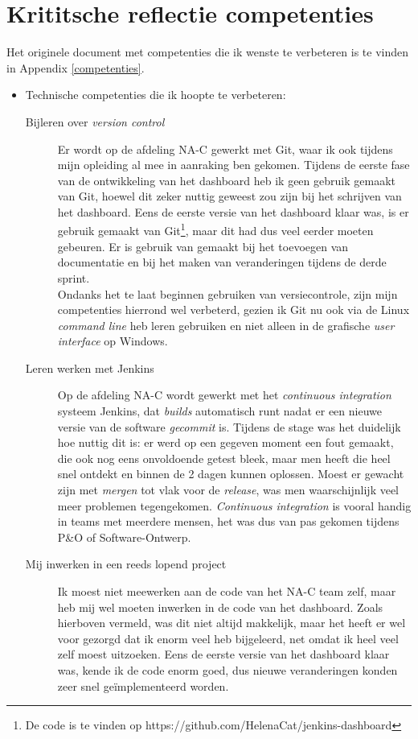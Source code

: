 \documentclass[10pt,a4paper]{article}
\begin{document}
\section{Krititsche reflectie competenties}
\label{reflectie}
Het originele document met competenties die ik wenste te verbeteren is te vinden in Appendix \ref{competenties}.
\begin{itemize}
\item Technische competenties die ik hoopte te verbeteren:
\begin{description}
\item[Bijleren over \textit{version control}] Er wordt op de afdeling NA-C gewerkt met Git, waar ik ook tijdens mijn opleiding al mee in aanraking ben gekomen. Tijdens de eerste fase van de ontwikkeling van het dashboard heb ik geen gebruik gemaakt van Git, hoewel dit zeker nuttig geweest zou zijn bij het schrijven van het dashboard. Eens de eerste versie van het dashboard klaar was, is er gebruik gemaakt van Git\footnote{De code is te vinden op https://github.com/HelenaCat/jenkins-dashboard}, maar dit had dus veel eerder moeten gebeuren. Er is gebruik van gemaakt bij het toevoegen van documentatie en bij het maken van veranderingen tijdens de derde sprint.\\
Ondanks het te laat beginnen gebruiken van versiecontrole, zijn mijn competenties hierrond wel verbeterd, gezien ik Git nu ook via de Linux \textit{command line} heb leren gebruiken en niet alleen in de grafische \textit{user interface} op Windows. 
\item[Leren werken met Jenkins] Op de afdeling NA-C wordt gewerkt met het \textit{continuous integration} systeem Jenkins, dat \textit{builds} automatisch runt nadat er een nieuwe versie van de software \textit{gecommit} is. Tijdens de stage was het duidelijk hoe nuttig dit is: er werd op een gegeven moment een fout gemaakt, die ook nog eens onvoldoende getest bleek, maar men heeft die heel snel ontdekt en binnen de 2 dagen kunnen oplossen. Moest er gewacht zijn met \textit{mergen} tot vlak voor de \textit{release}, was men waarschijnlijk veel meer problemen tegengekomen. \textit{Continuous integration} is vooral handig in teams met meerdere mensen, het was dus van pas gekomen tijdens P\&O of Software-Ontwerp. 
\item[Mij inwerken in een reeds lopend project] Ik moest niet meewerken aan de code van het NA-C team zelf, maar heb mij wel moeten inwerken in de code van het dashboard. Zoals hierboven vermeld, was dit niet altijd makkelijk, maar het heeft er wel voor gezorgd dat ik enorm veel heb bijgeleerd, net omdat ik heel veel zelf moest uitzoeken. Eens de eerste versie van het dashboard klaar was, kende ik de code enorm goed, dus nieuwe veranderingen konden zeer snel ge\"implementeerd worden.

\end{description}
\end{itemize}
\end{document}
